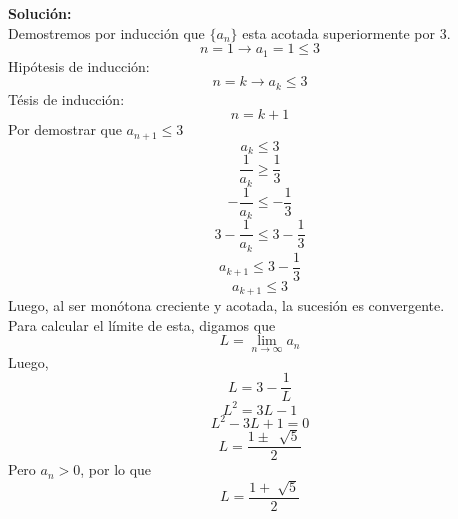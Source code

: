 \documentclass[12pt]{article}
\newenvironment{solucion}
{\begin{mdframed}[backgroundcolor=black!10]
		{\bf Solución:}\\
	}
	{
	\end{mdframed}
}
\newenvironment{preguntas}
{\begin{enumerate}\itemsep12pt
	}
	{
	\end{enumerate}
}
\newcommand{\ra}{\rightarrow}
\begin{document}
\begin{preguntas}
\begin{solucion}
Demostremos por inducción que $\{a_n\}$ esta acotada superiormente por 3. \\
$$n = 1 \ra a_1 = 1 \leq 3$$
Hipótesis de inducción:
$$n = k \ra a_k \leq 3$$
Tésis de inducción:
$$n = k+1$$
Por demostrar que $a_{n+1} \leq 3$
$$a_k \leq 3$$
$$\dfrac{1}{a_k} \geq \dfrac{1}{3}$$
$$-\dfrac{1}{a_k} \leq -\dfrac{1}{3}$$
$$3-\dfrac{1}{a_k} \leq 3-\dfrac{1}{3}$$
$$a_{k+1} \leq 3-\dfrac{1}{3}$$
$$a_{k+1} \leq 3$$
Luego, al ser monótona creciente y acotada, la sucesión es convergente.\\

Para calcular el límite de esta, digamos que
$$L = \lim\limits_{n \ra \infty} a_n$$
Luego,
$$L = 3 - \dfrac{1}{L}$$
$$L^2 = 3L - 1$$
$$L^2 - 3L + 1 = 0$$
$$L = \dfrac{1\pm\ \sqrt[]{5}}{2}$$
Pero $a_n > 0$, por lo que
$$L = \dfrac{1 + \sqrt[]{5}}{2}$$


\end{solucion}
\end{preguntas}
\end{document}
